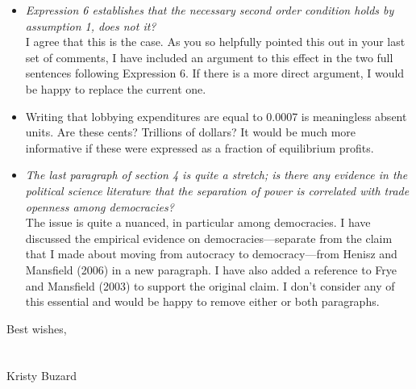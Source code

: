 \documentclass[12pt]{report}
\begin{document}
\begin{itemize}
  \item \textit{Expression 6 establishes that the necessary second order condition holds by assumption 1, does not it?} \\
	I agree that this is the case. As you so helpfully pointed this out in your last set of comments, I have included an argument to this effect in the two full sentences following Expression 6. If there is a more direct argument, I would be happy to replace the current one.
  \item Writing that lobbying expenditures are equal to 0.0007 is meaningless absent units. Are these cents? Trillions of dollars? It would be much more informative if these were expressed as a fraction of equilibrium profits.
  \item \textit{The last paragraph of section 4 is quite a stretch; is there any evidence in the political science literature that the separation of power is correlated with trade openness among democracies?} \\
	The issue is quite a nuanced, in particular among democracies. I have discussed the empirical evidence on democracies---separate from the claim that I made about moving from autocracy to democracy---from Henisz and Mansfield (2006) in a new paragraph. I have also added a reference to Frye and Mansfield (2003) to support the original claim. I don't consider any of this essential and would be happy to remove either or both paragraphs.
\end{itemize}


Best wishes,\\
\\
\\
Kristy Buzard
\end{document}
